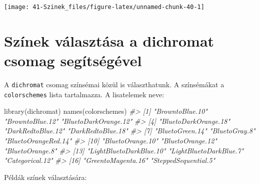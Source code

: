 \documentclass[
]{book}
\newenvironment{Shaded}{\begin{snugshade}}{\end{snugshade}}
\newcommand{\CommentTok}[1]{\textcolor[rgb]{0.56,0.35,0.01}{\textit{#1}}}
\newcommand{\FunctionTok}[1]{\textcolor[rgb]{0.00,0.00,0.00}{#1}}
\newcommand{\NormalTok}[1]{#1}
\begin{document}
\begin{center}\texttt{[image: 41-Szinek\_files/figure-latex/unnamed-chunk-40-1]} \end{center}

\hypertarget{szinek-valasztasa-dichromat}{%
\section{Színek választása a dichromat csomag segítségével}\label{szinek-valasztasa-dichromat}}

A \texttt{dichromat} csomag színsémai közül is választhatunk. A színsémákat a \texttt{colorschemes} lista tartalmazza. A lisatelemek neve:

\begin{Shaded}
\begin{Highlighting}[]
\FunctionTok{library}\NormalTok{(dichromat)}
\FunctionTok{names}\NormalTok{(colorschemes)}
\CommentTok{\#\textgreater{}  [1] "BrowntoBlue.10"         "BrowntoBlue.12"         "BluetoDarkOrange.12"   }
\CommentTok{\#\textgreater{}  [4] "BluetoDarkOrange.18"    "DarkRedtoBlue.12"       "DarkRedtoBlue.18"      }
\CommentTok{\#\textgreater{}  [7] "BluetoGreen.14"         "BluetoGray.8"           "BluetoOrangeRed.14"    }
\CommentTok{\#\textgreater{} [10] "BluetoOrange.10"        "BluetoOrange.12"        "BluetoOrange.8"        }
\CommentTok{\#\textgreater{} [13] "LightBluetoDarkBlue.10" "LightBluetoDarkBlue.7"  "Categorical.12"        }
\CommentTok{\#\textgreater{} [16] "GreentoMagenta.16"      "SteppedSequential.5"}
\end{Highlighting}
\end{Shaded}

Példák színek választására:
\end{document}
